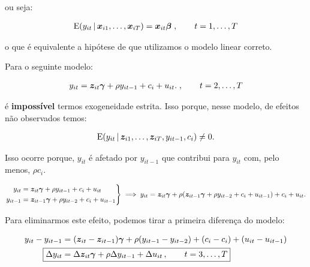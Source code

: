 \documentclass[11pt, oneside, a4paper, article]{article}
\numberwithin{equation}{section}
\begin{document}
\begin{description}
\noindent
ou seja:

\vspace{-1 em}
\begin{align*}
\text{E}( y_{it} \, | \, \boldsymbol{x}_{i1}, \dots, \boldsymbol{x}_{iT} ) = \boldsymbol{x}_{it} \boldsymbol{\beta} 
\; , \qquad t = 1, \dots, T
\end{align*}

\noindent
o que é equivalente a hipótese de que utilizamos o modelo linear correto.

Para o seguinte modelo:

\vspace{-1.5 em}
\begin{align*}
y_{it} = \boldsymbol{z}_{it} \boldsymbol{\gamma} + \rho y_{i t - 1} + c_{i} + u_{it}.
\; , \qquad t = 2, \dots, T
\end{align*}

\noindent
é \textbf{impossível} termos exogeneidade estrita.
Isso porque, nesse modelo, de efeitos não observados temos:

\vspace{-1.5 em}
\begin{align*}
	\text{E}( y_{it} \, | \, \boldsymbol{z}_{i1}, \dots, \boldsymbol{z}_{iT}, y_{it-1}, c_{i}) \neq 0.
\end{align*}

\noindent
Isso ocorre porque, $y_{it}$ é afetado por $y_{it-1}$ que contribui para $y_{it}$ com, pelo menos, $\rho c_{i}$.

\begin{equation*}
\left.
\begin{aligned}
y_{it} &= \boldsymbol{z}_{it} \boldsymbol{\gamma} + \rho y_{i t - 1} + c_{i} + u_{it}
\\
y_{it-1} &= \boldsymbol{z}_{it-1} \boldsymbol{\gamma} + \rho y_{i t - 2} + c_{i} + u_{it-1}
\end{aligned}
\right\} 
\implies
y_{it} = \boldsymbol{z}_{it} \boldsymbol{\gamma} +
\rho (\boldsymbol{z}_{it-1} \boldsymbol{\gamma} + \rho y_{i t - 2} + c_{i} + u_{it-1})
+ c_{i} + u_{it}.
\end{equation*}

Para eliminarmos este efeito, podemos tirar a primeira diferença do modelo:

\vspace{-1 em}
\begin{align}
\nonumber
y_{it} - y_{it-1} &= 
(\mbs{z}_{it} - \mbs{z}_{it-1}) \mbs{\gamma} +
\rho (y_{i t - 1} -  y_{i t - 2} ) +
(c_{i} - c_{i}) + (u_{it} - u_{it-1})
\\
\label{mod1:FDIV}
\Aboxed{
\Delta y_{it} &= 
\Delta \mbs{z}_{it} \mbs{\gamma} + \rho \Delta y_{i t - 1} + \Delta u_{it}
\, , \qquad t=3, \dots, T}
\end{align}


\end{description}
\end{document}
